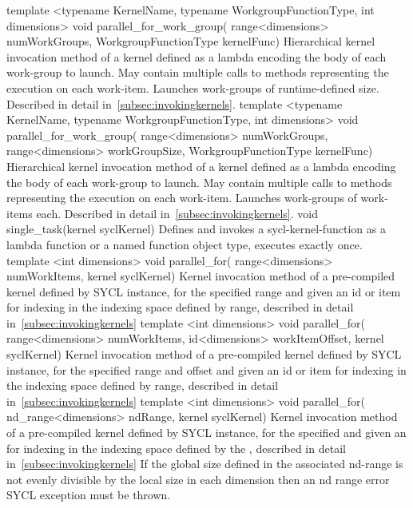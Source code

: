   \addRowFourL
    {template <typename KernelName, typename WorkgroupFunctionType, int dimensions>}
    {void parallel_for_work_group(}
    { range<dimensions> numWorkGroups,}
    { WorkgroupFunctionType kernelFunc)}
    {
      Hierarchical kernel invocation method of a kernel defined as a
      lambda encoding the body of each work-group to launch. May
      contain multiple calls to
       methods representing the
      execution on each work-item. Launches
       work-groups of runtime-defined
      size. Described in detail in~\ref{subsec:invokingkernels}.
    }
\addRowFiveL
  {template <typename KernelName, typename WorkgroupFunctionType, int dimensions>}
  {void parallel_for_work_group(}
  { range<dimensions> numWorkGroups,}
  { range<dimensions> workGroupSize,}
  { WorkgroupFunctionType kernelFunc)}
  {
    Hierarchical kernel invocation method of a kernel defined as a
    lambda encoding the body of each work-group to launch. May
    contain multiple calls to
     methods representing the
    execution on each work-item. Launches
     work-groups of
     work-items each. Described in
    detail in~\ref{subsec:invokingkernels}.
  }
  \addRow
    {void single_task(kernel syclKernel)}
    {
      Defines and invokes a \gls{sycl-kernel-function} as a lambda function
      or a named function object type, executes exactly once.
    }
  \addRowThreeL
    { template <int dimensions> void parallel_for(}
    { range<dimensions> numWorkItems,}
    { kernel syclKernel)}
    {
      Kernel invocation method of a pre-compiled \gls{kernel} defined by SYCL
       instance,
      for the specified range and given an id or item for indexing in the
      indexing space defined by range,
      described in detail in~\ref{subsec:invokingkernels}
    }
  \addRowThreeL
    { template <int dimensions> void parallel_for(}
    { range<dimensions> numWorkItems, }
    { id<dimensions> workItemOffset, kernel syclKernel) }
    {
      Kernel invocation method of a pre-compiled \gls{kernel} defined by SYCL
       instance,
      for the specified range and offset and given an id or item for indexing in the
      indexing space defined by range,
      described in detail in~\ref{subsec:invokingkernels}
    }
   \addRowThreeL
    { template <int dimensions> void parallel_for(}
    { nd_range<dimensions> ndRange,}
    { kernel syclKernel)}
    {
      Kernel invocation method of a pre-compiled \gls{kernel} defined by SYCL  instance,
      for the specified  and given an 
      for indexing in the indexing space defined by the ,
      described in detail in~\ref{subsec:invokingkernels} If the global size defined in the associated
      nd-range is not evenly divisible by the local size in each dimension then an nd range error
      SYCL exception must be thrown.
    }
\completeTable

